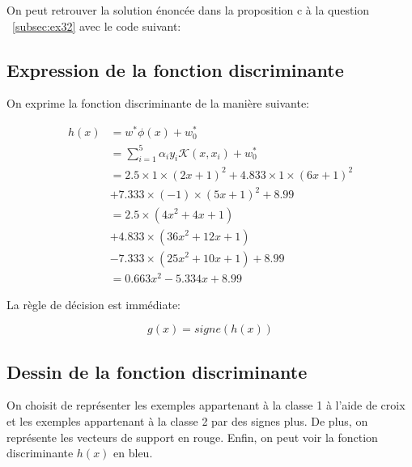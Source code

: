 \documentclass{article}
\begin{document}
\begin{multicols}{2}
On peut retrouver la solution énoncée dans la proposition c à la question
~\ref{subsec:ex32} avec le code suivant:



\subsection{Expression de la fonction discriminante}\label{subsec:ex34}

On exprime la fonction discriminante de la manière suivante:

\begin{equation}
    \begin{split}
        h(x) &= w^* \phi(x) + w_0^* \\
             &= \sum_{i = 1}^5 \alpha_i y_i \mathcal{K}(x, x_i) + w_0^* \\
             &= 2.5 \times 1 \times (2x + 1)^2 + 4.833 \times 1 \times
                (6x + 1)^2 \\
                & + 7.333 \times (-1) \times (5x + 1)^2 + 8.99 \\
             &= 2.5 \times (4x^2 + 4x + 1) \\
                & +4.833 \times (36x^2 + 12x + 1) \\
                & -7.333 \times (25x^2 + 10x + 1) + 8.99 \\
             &= 0.663x^2 - 5.334x + 8.99
    \end{split}
\end{equation}

La règle de décision est immédiate:

\begin{equation}
    g(x) = signe(h(x))
\end{equation}

\subsection{Dessin de la fonction discriminante}\label{subsec:ex35}

On choisit de représenter les exemples appartenant à la classe 1 à l'aide de
croix et les exemples appartenant à la classe 2 par des signes plus. De plus,
on représente les vecteurs de support en rouge. Enfin, on peut voir la fonction
discriminante $h(x)$ en bleu.


\end{multicols}
\end{document}
